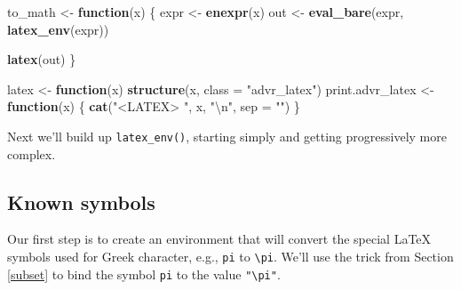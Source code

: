 \documentclass[]{book}
\newenvironment{Shaded}{\begin{snugshade}}{\end{snugshade}}
\newcommand{\CharTok}[1]{\textcolor[rgb]{0.5,0.5,0.5}{#1}}
\newcommand{\ControlFlowTok}[1]{\textcolor[rgb]{0.27,0.27,0.27}{\textbf{#1}}}
\newcommand{\DataTypeTok}[1]{\textcolor[rgb]{0.27,0.27,0.27}{#1}}
\newcommand{\KeywordTok}[1]{\textcolor[rgb]{0.27,0.27,0.27}{\textbf{#1}}}
\newcommand{\NormalTok}[1]{#1}
\newcommand{\StringTok}[1]{\textcolor[rgb]{0.5,0.5,0.5}{#1}}
\begin{document}
\begin{Shaded}
\begin{Highlighting}[]
\NormalTok{to_math <-}\StringTok{ }\ControlFlowTok{function}\NormalTok{(x) \{}
\NormalTok{  expr <-}\StringTok{ }\KeywordTok{enexpr}\NormalTok{(x)}
\NormalTok{  out <-}\StringTok{ }\KeywordTok{eval_bare}\NormalTok{(expr, }\KeywordTok{latex_env}\NormalTok{(expr))}

  \KeywordTok{latex}\NormalTok{(out)}
\NormalTok{\}}

\NormalTok{latex <-}\StringTok{ }\ControlFlowTok{function}\NormalTok{(x) }\KeywordTok{structure}\NormalTok{(x, }\DataTypeTok{class =} \StringTok{"advr_latex"}\NormalTok{)}
\NormalTok{print.advr_latex <-}\StringTok{ }\ControlFlowTok{function}\NormalTok{(x) \{}
  \KeywordTok{cat}\NormalTok{(}\StringTok{"<LATEX> "}\NormalTok{, x, }\StringTok{"}\CharTok{\textbackslash{}n}\StringTok{"}\NormalTok{, }\DataTypeTok{sep =} \StringTok{""}\NormalTok{)}
\NormalTok{\}}
\end{Highlighting}
\end{Shaded}

Next we'll build up \texttt{latex\_env()}, starting simply and getting progressively more complex.

\hypertarget{known-symbols}{%
\subsection{Known symbols}\label{known-symbols}}

Our first step is to create an environment that will convert the special LaTeX symbols used for Greek character, e.g., \texttt{pi} to \texttt{\textbackslash{}pi}. We'll use the trick from Section \ref{subset} to bind the symbol \texttt{pi} to the value \texttt{"\textbackslash{}pi"}.
\end{document}
